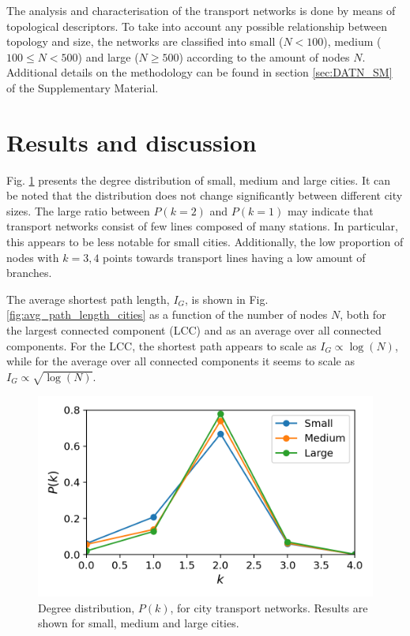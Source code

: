 The analysis and characterisation of the transport networks is done by means of topological descriptors. To take into account any possible relationship between topology and size, the networks are classified into small ($N < 100$), medium ($100 \leq N < 500$) and large ($N \geq 500$) according to the amount of nodes $N$. Additional details on the methodology can be found in section \ref{sec:DATN_SM} of the Supplementary Material.


\section{Results and discussion}

Fig. \ref{fig:degree_dist_cities} presents the degree distribution of small, medium and large cities. It can be noted that the distribution does not change significantly between different city sizes. The large ratio between $P(k=2)$ and $P(k=1)$ may indicate that transport networks consist of few lines composed of many stations. In particular, this appears to be less notable for small cities. Additionally, the low proportion of nodes with $k=3, 4$ points towards transport lines having a low amount of branches.

The average shortest path length, $I_G$, is shown in Fig. \ref{fig:avg_path_length_cities} as a function of the number of nodes $N$, both for the largest connected component (LCC) and as an average over all connected components. For the LCC, the shortest path appears to scale as $I_G\propto \log(N)$, while for the average over all connected components it seems to scale as $I_G\propto \sqrt{\log(N)}$. 

\begin{figure}[!h]
	\begin{center}
	\includegraphics[scale=0.75]{./images/task_41/degree_dist_cities.png} 
	\end{center}
	\caption{Degree distribution, $P(k)$, for city transport networks. Results are shown for small, medium and large cities.\\} 
	\label{fig:degree_dist_cities} 
\end{figure}


